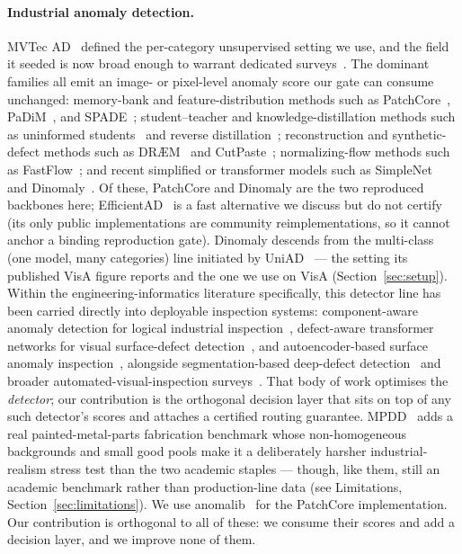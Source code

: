 \documentclass[preprint,11pt]{elsarticle}
\begin{document}
\paragraph{Industrial anomaly detection.} MVTec AD~\citep{bergmann2019mvtec} defined the
per-category unsupervised setting we use, and the field it seeded is now broad enough to warrant
dedicated surveys~\citep{liu2024survey}. The dominant families all emit an image- or pixel-level
anomaly score our gate can consume unchanged: memory-bank and feature-distribution methods such as
PatchCore~\citep{roth2022patchcore}, PaDiM~\citep{defard2021padim}, and
SPADE~\citep{cohen2020spade}; student--teacher and knowledge-distillation methods such as uninformed
students~\citep{bergmann2020uninformed} and reverse distillation~\citep{deng2022reverse};
reconstruction and synthetic-defect methods such as DR{\AE}M~\citep{zavrtanik2021draem} and
CutPaste~\citep{li2021cutpaste}; normalizing-flow methods such as
FastFlow~\citep{yu2021fastflow}; and recent simplified or transformer models such as
SimpleNet~\citep{liu2023simplenet} and Dinomaly~\citep{guo2025dinomaly}. Of these, PatchCore and
Dinomaly are the two reproduced backbones here; EfficientAD~\citep{batzner2024efficientad} is a fast
alternative we discuss but do not certify (its only public implementations are community
reimplementations, so it cannot anchor a binding reproduction gate). Dinomaly descends from the
multi-class (one model, many categories) line initiated by UniAD~\citep{you2022unified} --- the
setting its published VisA figure reports and the one we use on VisA
(Section~\ref{sec:setup}). Within the engineering-informatics literature specifically, this
detector line has been carried directly into deployable inspection systems: component-aware anomaly
detection for logical industrial inspection~\citep{liu2023component}, defect-aware transformer
networks for visual surface-defect detection~\citep{shang2023defect}, and autoencoder-based surface
anomaly inspection~\citep{tsai2021autoencoder}, alongside segmentation-based deep-defect
detection~\citep{tabernik2020segmentation} and broader automated-visual-inspection
surveys~\citep{czimmermann2020visual}. That body of work optimises the \emph{detector}; our
contribution is the orthogonal decision layer that sits on top of any such detector's scores and
attaches a certified routing guarantee. MPDD~\citep{jezek2021mpdd} adds a real painted-metal-parts
fabrication benchmark whose non-homogeneous backgrounds and small good pools make it a deliberately
harsher industrial-realism stress test than the two academic staples --- though, like them, still an
academic benchmark rather than production-line data (see Limitations, Section~\ref{sec:limitations}).
We use
anomalib~\citep{akcay2022anomalib} for the PatchCore implementation. Our contribution is orthogonal
to all of these: we consume their scores and add a decision layer, and we improve none of them.
\end{document}
